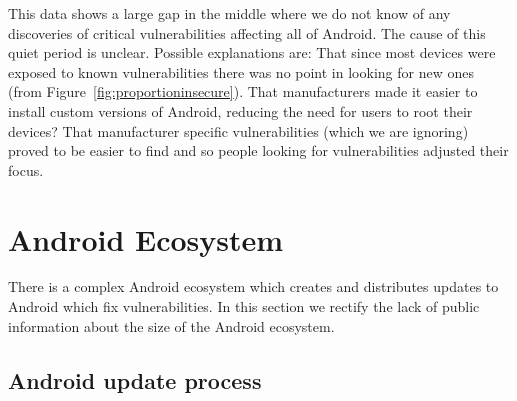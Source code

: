 \documentclass[conference,a4paper,twoside]{IEEEtran}
\begin{document}
This data shows a large gap in the middle where we do not know of any discoveries of critical vulnerabilities affecting all of Android.
The cause of this quiet period is unclear.
Possible explanations are: That since most devices were exposed to known vulnerabilities there was no point in looking for new ones (from Figure~\ref{fig:proportioninsecure}).
That manufacturers made it easier to install custom versions of Android, reducing the need for users to root their devices?
That manufacturer specific vulnerabilities (which we are ignoring) proved to be easier to find and so people looking for vulnerabilities adjusted their focus.

\section{Android Ecosystem}\label{sec:android_ecosystem}
There is a complex Android ecosystem which creates and distributes updates to Android which fix vulnerabilities.
In this section we rectify the lack of public information about the size of the Android ecosystem.


\subsection{Android update process}
\end{document}
